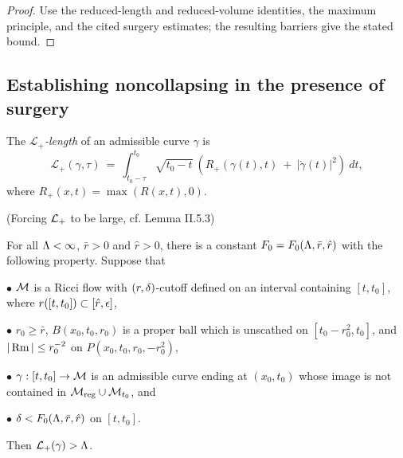 \begin{proof}
\sketch Use the reduced-length and reduced-volume identities, the maximum principle, and the cited surgery estimates; the resulting barriers give the stated bound.
\end{proof}

\subsection{Establishing noncollapsing in the presence of surgery}
\label{II.5.2section}

\begin{definition}
  \label{def:kl-establishing-noncollapsing-presence-surgery-noncollapsing-definition}

The {\em ${\mathcal L}_+$-length} of an admissible curve $\gamma$ is
\begin{equation}
{\mathcal L}_+(\gamma, \tau) \: = \:
\int_{t_0 - \tau}^{t_0} \sqrt{t_0 - t} \: \left(
R_+(\gamma(t), t) \: + \: |\dot{\gamma}(t)|^2 \right) \: dt,
\end{equation}
where $R_+(x,t) = \max(R(x,t), 0)$.
\end{definition}

\begin{lemma}
  \label{lem:kl-establishing-noncollapsing-presence-surgery-existence-noncollapsing}
(Forcing ${\mathcal L}_+$ to be large, cf. Lemma II.5.3)
\label{lplusbig}

For all $\Lambda< \infty$, $\bar r>0$ and $\hat r>0$,
there is  a constant  $F_0=F_0(\Lambda,\bar r,\hat r)$
with the following property.  Suppose that

$\bullet$  ${\mathcal M}$ is a Ricci flow  with $(r,\delta)$-cutoff
defined on an interval containing $[t,t_0]$, where
 $r([t,t_0])\subset [\hat r,\epsilon]$,

$\bullet$ $r_0\geq \bar r$,
 $B(x_0,t_0,r_0)$ is a proper ball which is unscathed on $[t_0-r_0^2,t_0]$, and
$|\operatorname{Rm}|\leq r_0^{-2}$ on $P(x_0,t_0,r_0,-r_0^2)$,

$\bullet$ $\gamma:[t,t_0]\rightarrow{\mathcal M}$ is an admissible curve
ending at $(x_0, t_0)$
whose image
is not contained in ${\mathcal M}_{\operatorname{reg}}\cup{\mathcal M}_{t_0}$, and

$\bullet$ $\delta < F_0(\Lambda,\bar r,\hat r)$
on $[t,t_0]$.

\noindent
Then ${\mathcal L}_+(\gamma)>\Lambda$.
\end{lemma}


